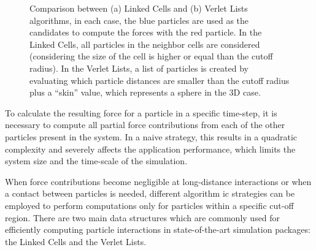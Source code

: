 \documentclass[Afour,sageh,times]{sagej}
\newcommand{\RMchange}[1]{{\color{blue} #1}}
\begin{document}
\begin{figure}[htb]
    \centering
    \caption{Comparison between (a) Linked Cells and (b) Verlet Lists algorithms, in each case, the blue particles are used as the candidates to compute the forces with the red particle. In the Linked Cells, all particles in the neighbor cells are considered (considering the size of the cell is higher or equal than the cutoff radius). In the Verlet Lists, a list of particles is created by evaluating which particle distances are smaller than the cutoff radius plus a ``skin'' value, which represents a sphere in the 3D case.}
\end{figure}

To calculate the resulting force for a particle in a specific time-step, it is necessary to compute all partial force contributions from each of the other particles present in the system.
In a naive strategy, this results in a quadratic complexity and severely affects the application performance, which limits the system size and the time-scale of the simulation.

When force contributions become negligible at long-distance interactions or when a contact between particles is needed, different algorithm\RMchange{ic} strategies can be employed to perform computations only for particles within a specific cut-off region.
There are two main data structures which are commonly used for efficiently computing particle interactions in state-of-the-art simulation packages: the Linked Cells and the Verlet Lists.
\end{document}
